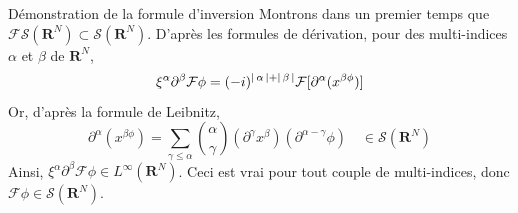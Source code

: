         \begin{demo}{Démonstration de la formule d’inversion}
            Montrons dans un premier temps que $\mathcal{F}\mathcal{S}(\mathbf{R}^N) \subset \mathcal{S}(\mathbf{R}^N)$. D’après les formules de dérivation, pour des multi-indices $\alpha$ et $\beta$ de $\mathbf{R}^N$, 
            \[ \xi^{\alpha} \partial^{\beta} \mathcal{F}\phi = (-i)^{\left\lvert \, \alpha \, \right\rvert + \left\lvert \, \beta \, \right\rvert} \mathcal{F}[\partial^{\alpha}(x^{\beta \phi})] \]   
            Or, d’après la formule de Leibnitz, 
            \[ \partial^{\alpha}(x^{\beta \phi}) = \sum_{\gamma \leq \alpha} \binom{\alpha}{\gamma} (\partial^{\gamma} x^{\beta})(\partial^{\alpha - \gamma}\phi) \quad \in \mathcal{S}(\mathbf{R}^N) \]   
            Ainsi, $\xi^{\alpha} \partial^{\beta} \mathcal{F}\phi \in L^{\infty}(\mathbf{R}^N)$. Ceci est vrai pour tout couple de multi-indices, donc $\mathcal{F}\phi \in \mathcal{S}(\mathbf{R}^N)$.


\end{demo}
